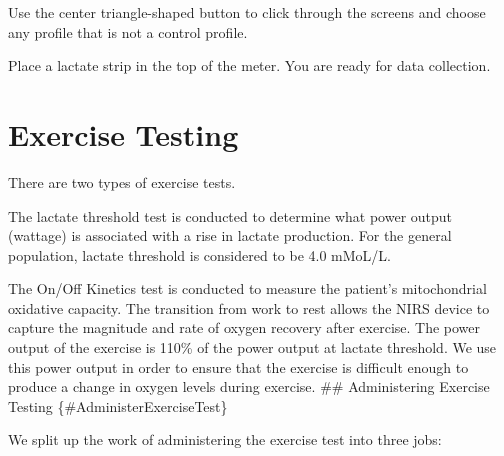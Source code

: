 \documentclass[
]{book}
\begin{document}
Use the center triangle-shaped button to click through the screens and choose any profile that is not a control profile.

Place a lactate strip in the top of the meter. You are ready for data collection.

\hypertarget{ExerciseTesting}{%
\chapter{Exercise Testing}\label{ExerciseTesting}}

There are two types of exercise tests.

The lactate threshold test is conducted to determine what power output (wattage) is associated with a rise in lactate production. For the general population, lactate threshold is considered to be 4.0 mMoL/L.

The On/Off Kinetics test is conducted to measure the patient's mitochondrial oxidative capacity. The transition from work to rest allows the NIRS device to capture the magnitude and rate of oxygen recovery after exercise. The power output of the exercise is 110\% of the power output at lactate threshold. We use this power output in order to ensure that the exercise is difficult enough to produce a change in oxygen levels during exercise.
\#\# Administering Exercise Testing \{\#AdministerExerciseTest\}

We split up the work of administering the exercise test into three jobs:
\end{document}
